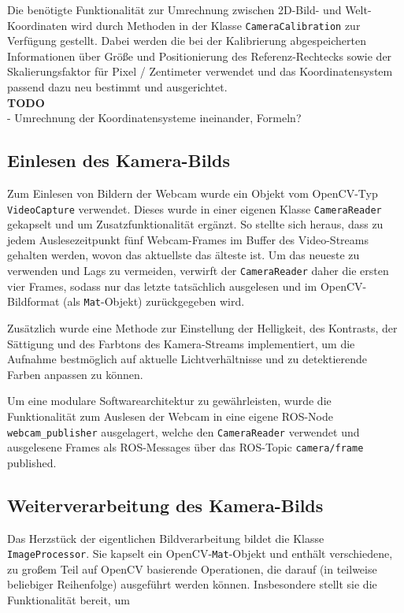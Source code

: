 Die ben\"otigte Funktionalit\"at zur Umrechnung zwischen 2D-Bild- und Welt-Koordinaten wird durch
Methoden in der Klasse \texttt{CameraCalibration} zur Verf\"ugung gestellt. Dabei werden die bei der Kalibrierung
abgespeicherten Informationen \"uber Gr\"o\ss e und Positionierung des Referenz-Rechtecks sowie der
Skalierungsfaktor f\"ur Pixel / Zentimeter verwendet
und das Koordinatensystem passend dazu neu bestimmt und ausgerichtet.\\

\textbf{TODO}\\
- Umrechnung der Koordinatensysteme ineinander, Formeln?\\

\subsection{Einlesen des Kamera-Bilds}

Zum Einlesen von Bildern der Webcam wurde ein Objekt vom OpenCV-Typ \texttt{VideoCapture} verwendet.
Dieses wurde in einer eigenen Klasse \texttt{CameraReader} gekapselt und um Zusatzfunktionalit\"at
erg\"anzt. So stellte sich heraus, dass zu jedem Auslesezeitpunkt f\"unf Webcam-Frames im Buffer des
Video-Streams gehalten werden, wovon das aktuellste das \"alteste ist. Um das neueste zu verwenden
und Lags zu vermeiden, verwirft der \texttt{CameraReader} daher die ersten vier Frames, sodass nur das letzte
tats\"achlich ausgelesen und im OpenCV-Bildformat (als \texttt{Mat}-Objekt) zur\"uckgegeben wird.

Zus\"atzlich wurde eine Methode zur Einstellung der Helligkeit, des Kontrasts, der S\"attigung und des
Farbtons des Kamera-Streams implementiert, um die Aufnahme bestm\"oglich auf aktuelle Lichtverh\"altnisse und zu
detektierende Farben anpassen zu k\"onnen.

Um eine modulare Softwarearchitektur zu gew\"ahrleisten, wurde die Funktionalit\"at zum Auslesen der Webcam
in eine eigene ROS-Node \texttt{webcam\_publisher} ausgelagert, welche den
\texttt{CameraReader} verwendet und ausgelesene Frames als ROS-Messages \"uber das ROS-Topic
\texttt{camera/frame} published.

\subsection{Weiterverarbeitung des Kamera-Bilds}

Das Herzst\"uck der eigentlichen Bildverarbeitung bildet die Klasse \texttt{ImageProcessor}. Sie kapselt
ein OpenCV-\texttt{Mat}-Objekt und enth\"alt verschiedene, zu gro\ss em Teil auf OpenCV basierende
Operationen, die darauf (in teilweise beliebiger
Reihenfolge) ausgef\"uhrt werden k\"onnen. Insbesondere stellt sie die Funktionalit\"at bereit, um

